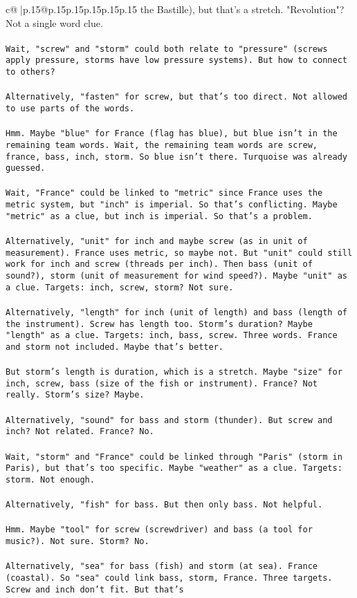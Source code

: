 \documentclass{article}
\begin{document}
{\begin{supertabular}{c@{$\;$}|p{.15\linewidth}@{}p{.15\linewidth}p{.15\linewidth}p{.15\linewidth}p{.15\linewidth}p{.15\linewidth}}
{{{the Bastille), but that's a stretch. "Revolution"? Not a single word clue.\\ \tt \\ \tt Wait, "screw" and "storm" could both relate to "pressure" (screws apply pressure, storms have low pressure systems). But how to connect to others?\\ \tt \\ \tt Alternatively, "fasten" for screw, but that's too direct. Not allowed to use parts of the words.\\ \tt \\ \tt Hmm. Maybe "blue" for France (flag has blue), but blue isn't in the remaining team words. Wait, the remaining team words are screw, france, bass, inch, storm. So blue isn't there. Turquoise was already guessed.\\ \tt \\ \tt Wait, "France" could be linked to "metric" since France uses the metric system, but "inch" is imperial. So that's conflicting. Maybe "metric" as a clue, but inch is imperial. So that's a problem.\\ \tt \\ \tt Alternatively, "unit" for inch and maybe screw (as in unit of measurement). France uses metric, so maybe not. But "unit" could still work for inch and screw (threads per inch). Then bass (unit of sound?), storm (unit of measurement for wind speed?). Maybe "unit" as a clue. Targets: inch, screw, storm? Not sure.\\ \tt \\ \tt Alternatively, "length" for inch (unit of length) and bass (length of the instrument). Screw has length too. Storm's duration? Maybe "length" as a clue. Targets: inch, bass, screw. Three words. France and storm not included. Maybe that's better.\\ \tt \\ \tt But storm's length is duration, which is a stretch. Maybe "size" for inch, screw, bass (size of the fish or instrument). France? Not really. Storm's size? Maybe.\\ \tt \\ \tt Alternatively, "sound" for bass and storm (thunder). But screw and inch? Not related. France? No.\\ \tt \\ \tt Wait, "storm" and "France" could be linked through "Paris" (storm in Paris), but that's too specific. Maybe "weather" as a clue. Targets: storm. Not enough.\\ \tt \\ \tt Alternatively, "fish" for bass. But then only bass. Not helpful.\\ \tt \\ \tt Hmm. Maybe "tool" for screw (screwdriver) and bass (a tool for music?). Not sure. Storm? No.\\ \tt \\ \tt Alternatively, "sea" for bass (fish) and storm (at sea). France (coastal). So "sea" could link bass, storm, France. Three targets. Screw and inch don't fit. But that's }}}
\end{supertabular}}
\end{document}
